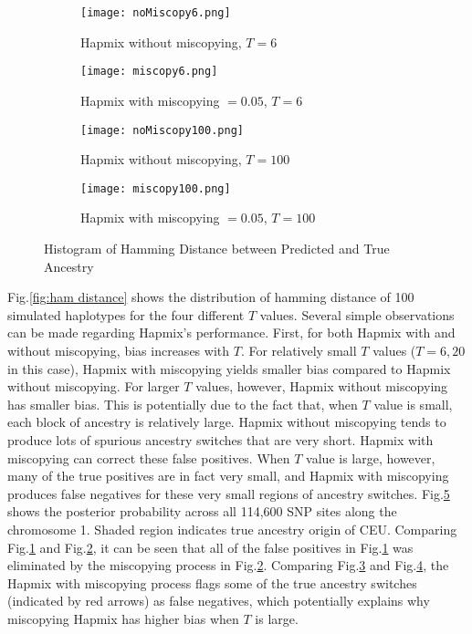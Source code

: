 \documentclass{article}
\begin{document}
     \begin{figure}[H]
     \centering
     \begin{subfigure}[b]{0.45\textwidth}
         \centering
         \texttt{[image: noMiscopy6.png]}
         \caption{Hapmix without miscopying, $T=6$}
         \label{fig:noMiscopy6}
     \end{subfigure}
     \hfill
     \begin{subfigure}[b]{0.45\textwidth}
         \centering
         \texttt{[image: miscopy6.png]}
         \caption{Hapmix with miscopying $=0.05$, $T=6$}
         \label{fig:miscopy6}
     \end{subfigure}
     \vfill
     \begin{subfigure}[b]{0.45\textwidth}
         \centering
         \texttt{[image: noMiscopy100.png]}
         \caption{Hapmix without miscopying, $T=100$}
         \label{fig:noMiscopy100}
     \end{subfigure}
     \hfill
     \begin{subfigure}[b]{0.45\textwidth}
         \centering
         \texttt{[image: miscopy100.png]}
         \caption{Hapmix with miscopying $=0.05$, $T=100$}
         \label{fig:miscopy100}
     \end{subfigure}
        \caption{Histogram of Hamming Distance between Predicted and True Ancestry}
        \label{fig:posterior}
\end{figure}
    
    
    
    
    Fig.\ref{fig:ham distance} shows the distribution of hamming distance of 100 simulated haplotypes for the four different $T$ values. Several simple observations can be made regarding Hapmix's performance. First, for both Hapmix with and without miscopying, bias increases with $T$. For relatively small $T$ values ($T=6,20$ in this case), Hapmix with miscopying yields smaller bias compared to Hapmix without miscopying. For larger $T$ values, however, Hapmix without miscopying has smaller bias. This is potentially due to the fact that, when $T$ value is small, each block of ancestry is relatively large. Hapmix without miscopying tends to produce lots of spurious ancestry switches that are very short. Hapmix with miscopying can correct these false positives. When $T$ value is large, however, many of the true positives are in fact very small, and Hapmix with miscopying produces false negatives for these very small regions of ancestry switches. Fig.\ref{fig:posterior} shows the posterior probability across all 114,600 SNP sites along the chromosome 1. Shaded region indicates true ancestry origin of CEU. Comparing Fig.\ref{fig:noMiscopy6} and Fig.\ref{fig:miscopy6}, it can be seen that all of the false positives in Fig.\ref{fig:noMiscopy6} was eliminated by the miscopying process in Fig.\ref{fig:miscopy6}. Comparing Fig.\ref{fig:noMiscopy100} and Fig.\ref{fig:miscopy100}, the Hapmix with miscopying process flags some of the true ancestry switches (indicated by red arrows) as false negatives, which potentially explains why miscopying Hapmix has higher bias when $T$ is large.
    
\end{document}
